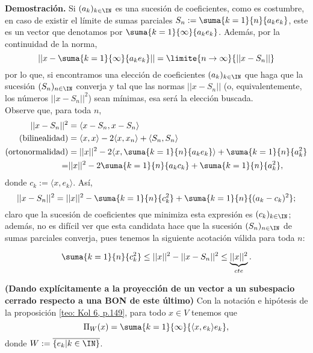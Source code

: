 \noindent
\textbf{Demostración.}
Si $(a_{k})_{k \in \IN}$ es una sucesión de coeficientes,
como es costumbre,
en caso de existir el límite de sumas parciales
$S_{n}:= \suma{k=1}{n}{a_{k}e_{k}}$, este es un vector que denotamos
por $\suma{k=1}{\infty}{a_{k}e_{k}}$. Además,
por la continuidad de la norma,
\[
||x - \suma{k=1}{\infty}{a_{k}e_{k}} || = \limite{n \rightarrow \infty }{||x-S_{n}||}
\]
por lo que, si encontramos una elección de coeficientes $(a_{k})_{k \in \IN}$
que haga que
la sucesión $(S_{n})_{n \in \IN}$ converja y tal que las normas
$||x-S_{n}||$ (o, equivalentemente, los números $||x-S_{n}||^{2}$)
sean mínimas, esa será la elección buscada. \\
Observe que, para toda $n$,
\begin{align*}
||x-S_{n}||^{2} & = \langle x-S_{n} , x-S_{n} \rangle \\
\text{(bilinealidad)} & = \langle x, x \rangle - 2 \langle x, x_{n} \rangle + 
\langle S_{n} , S_{n} \rangle \\
\text{(ortonormalidad)} & =  ||x||^{2} - 
2 \langle x ,\suma{k=1}{n}{a_{k}e_{k}} \rangle + 
\suma{k=1}{n}{a_{k}^{2}} \\
= & ||x||^{2} - 2\suma{k=1}{n}{a_{k}c_{k}}  + 
\suma{k=1}{n}{a_{k}^{2}},
\end{align*}
donde $c_{k}:= \langle x , e_{k} \rangle $. Así,
\[
||x-S_{n}||^{2} = ||x||^{2} - \suma{k=1}{n}{c_{k}^{2}}  + 
\suma{k=1}{n}{(a_{k}-c_{k})^{2}};
\]
claro que la sucesión de coeficientes que minimiza
esta expresión es $(c_{k})_{k \in \IN}$; además, no es difícil ver
que esta candidata hace que la sucesión $(S_{n})_{n \in \IN}$
de sumas parciales converja, pues tenemos la siguiente acotación
válida para toda $n$:

\begin{equation} \label{ecuacion teor kolmogorov}
\suma{k=1}{n}{c_{k}^{2}} \leq ||x||^{2}-||x-S_{n}||^{2} \leq 
\underbrace{||x||^{2}}_{cte}.
\end{equation}

\QEDB
\vspace{0.2cm}


\begin{cor} \label{cor: proyeccion en terminos de una BON}
\textbf{(Dando explícitamente a la proyección de un vector
a un subespacio cerrado respecto a una BON de este último)}
Con la notación 
e hipótesis
de la proposición \ref{teo: Kol 6, p.149},
para todo $x \in V$
tenemos que
\[
\Pi_{W}(x) = \suma{k=1}{\infty}{ \langle x, e_{k} \rangle e_{k}},
\]
donde $W := \overline{\{e_{k}| k \in \IN \}}$. 
\end{cor}

